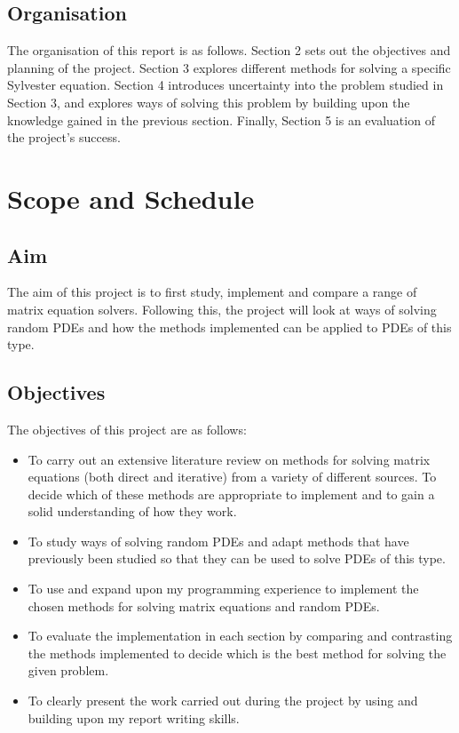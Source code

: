 \documentclass[11pt]{article}
\numberwithin{equation}{section}
\begin{document}
\subsection{Organisation}
The organisation of this report is as follows. Section 2 sets out the objectives and planning of the project. Section 3 explores different methods for solving a specific Sylvester equation. Section 4 introduces uncertainty into the problem studied in Section 3, and explores ways of solving this problem by building upon the knowledge gained in the previous section. Finally, Section 5 is an evaluation of the project's success.

\newpage

\section{Scope and Schedule}
\subsection{Aim}
The aim of this project is to first study, implement and compare a range of matrix equation solvers. Following this, the project will look at ways of solving random PDEs and how the methods implemented can be applied to PDEs of this type.

\subsection{Objectives}
The objectives of this project are as follows:
\begin{itemize}
\item To carry out an extensive literature review on methods for solving matrix equations (both direct and iterative) from a variety of different sources. To decide which of these methods are appropriate to implement and to gain a solid understanding of how they work.
\item To study ways of solving random PDEs and adapt methods that have previously been studied so that they can be used to solve PDEs of this type. 
\item To use and expand upon my programming experience to implement the chosen methods for solving matrix equations and random PDEs. 
\item To evaluate the implementation in each section by comparing and contrasting the methods implemented to decide which is the best method for solving the given problem.
\item To clearly present the work carried out during the project by using and building upon my report writing skills.
\end{itemize}
\end{document}
